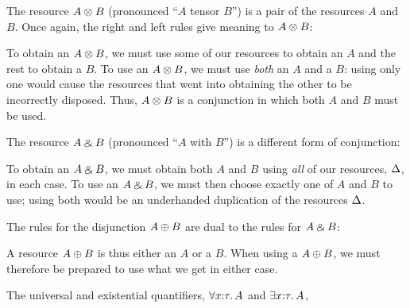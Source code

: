 The resource $A \otimes B$ (pronounced \enquote{$A$ tensor $B$}) is a pair of the resources $A$ and $B$.
Once again, the right and left rules give meaning to $A \otimes B$:
To obtain an $A \otimes B$, we must use some of our resources to obtain an $A$ and the rest to obtain a $B$.
To use an $A \otimes B$, we must use \emph{both} an $A$ and a $B$: using only one would cause the resources that went into obtaining the other to be incorrectly disposed.
Thus, $A \otimes B$ is a conjunction in which both $A$ and $B$ must be used.

The resource $A \mathbin{\binampersand} B$ (pronounced \enquote{$A$ with $B$}) is a different form of conjunction:
To obtain an $A \mathbin{\binampersand} B$, we must obtain both $A$ and $B$ using \emph{all} of our resources, $\Delta$, in each case.
To use an $A \mathbin{\binampersand} B$, we must then choose exactly one of $A$ and $B$ to use; using both would be an underhanded duplication of the resources $\Delta$.

The rules for the disjunction $A \oplus B$ are dual to the rules for $A \mathbin{\binampersand} B$:
A resource $A \oplus B$ is thus either an $A$ or a $B$.
When using a $A \oplus B$, we must therefore be prepared to use what we get in either case.

The universal and existential quantifiers, $\univq x:\tau.A$ and $\existq x:\tau.A$, 

